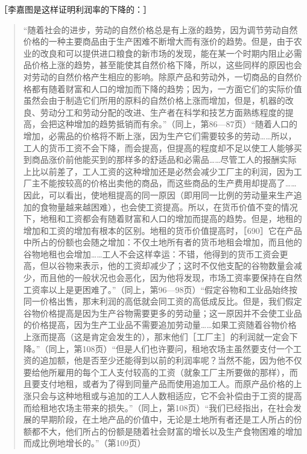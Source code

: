 
［李嘉图是这样证明利润率的下降的：］

\begin{quote}{“随着社会的进步，劳动的自然价格总是有上涨的趋势，因为调节劳动自然价格的一种主要商品由于生产困难不断增大而有涨价的趋势。但是，由于农业的改良和可以提供进口粮食的新市场的发现，能在某一个时期内阻止必需品价格上涨的趋势，甚至能使其自然价格下降，所以，这些同样的原因也会对劳动的自然价格产生相应的影响。除原产品和劳动外，一切商品的自然价格都有随着财富和人口的增加而下降的趋势；因为，一方面它们的实际价值虽然会由于制造它们所用的原料的自然价格上涨而增加，但是，机器的改良、劳动分工和劳动分配的改进、生产者在科学和技艺方面熟练程度的提高，会把这种增加的趋势抵销而有余。”（同上，第86—87页）“随着人口的增加，必需品的价格将不断上涨，因为生产它们需要较多的劳动……所以，工人的货币工资不会下降，而会提高，但提高的程度却不足以使工人能够买到商品涨价前他能买到的那样多的舒适品和必需品……尽管工人的报酬实际上比以前差了，工人工资的这种增加还是必然会减少工厂主的利润，因为工厂主不能按较高的价格出卖他的商品，而这些商品的生产费用却提高了……因此，可以看出，使地租提高的同一原因（即用同一比例的劳动量来生产追加的食物量越来越困难），也会使工资提高。所以，在货币价值不变的情况下，地租和工资都会有随着财富和人口的增加而提高的趋势。但是，地租的增加和工资的增加有根本的区别。地租的货币价值提高时，［690］它在产品中所占的份额也会随之增加：不仅土地所有者的货币地租会增加，而且他的谷物地租也会增加……工人不会这样幸运：不错，他得到的货币工资会更高，但以谷物来表示，他的工资却减少了；这时不仅他支配的谷物数量会减少，而且他的一般状况也会恶化，因为他将发现，市场工资率要保持在自然工资率以上是更困难了。”（同上，第96—98页）“假定谷物和工业品始终按同一价格出售，那末利润的高低就会同工资的高低成反比。但是，我们假定谷物价格提高是因为生产谷物需要更多的劳动量；这一原因并不会使工业品的价格提高，因为生产工业品不需要追加劳动量……如果工资随着谷物价格上涨而提高（这是肯定会发生的），那末他们［工厂主］的利润就一定会下降。”（同上，第108页）“但是人们也许要问，租地农场主虽然要支付一个工资的追加额，他是否至少还能得到以前的利润率呢？当然不能，因为他不仅要给他所雇用的每个工人支付较高的工资（就象工厂主所要做的那样），而且要支付地租，或者为了得到同量产品而使用追加工人。而原产品价格的上涨只会与这种地租或与追加的工人人数相适应，它不会补偿由于工资的提高而给租地农场主带来的损失。”（同上，第108页）“我们已经指出，在社会发展的早期阶段，在土地产品的价值中，无论是土地所有者还是工人所占的份额都不大，他们所占的份额是随着社会财富的增长以及生产食物困难的增加而成比例地增长的。”（第109页）}\end{quote}

